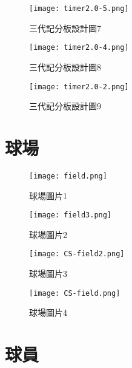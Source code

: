 \begin{figure}
  \centering
  \texttt{[image: timer2.0-5.png]}
  \caption{三代記分板設計圖7}
  \label{fig:example}
\end{figure}


\begin{figure}
  \centering
  \texttt{[image: timer2.0-4.png]}
  \caption{三代記分板設計圖8}
  \label{fig:example}
\end{figure}


\begin{figure}
  \centering
  \texttt{[image: timer2.0-2.png]}
  \caption{三代記分板設計圖9}
  \label{fig:example}
\end{figure}


\newpage
\section{球場}

\begin{figure}
  \centering
  \texttt{[image: field.png]}
  \caption{球場圖片1}
  \label{fig:example}
\end{figure}


\begin{figure}
  \centering
  \texttt{[image: field3.png]}
  \caption{球場圖片2}
  \label{fig:example}
\end{figure}


\begin{figure}
  \centering
  \texttt{[image: CS-field2.png]}
  \caption{球場圖片3}
  \label{fig:example}
\end{figure}


\begin{figure}
  \centering
  \texttt{[image: CS-field.png]}
  \caption{球場圖片4}
  \label{fig:example}
\end{figure}
\section{球員}